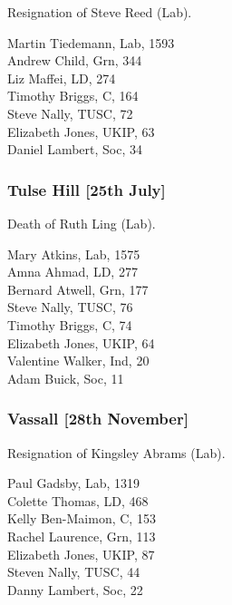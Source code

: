 \documentclass[a4paper,openany,10pt]{book}
\begin{document}

Resignation of Steve Reed (Lab).



Martin Tiedemann, Lab, 1593\\
Andrew Child, Grn, 344\\
Liz Maffei, LD, 274\\
Timothy Briggs, C, 164\\
Steve Nally, TUSC, 72\\
Elizabeth Jones, UKIP, 63\\
Daniel Lambert, Soc, 34\\


\subsubsection*{Tulse Hill \hspace*{\fill}\nolinebreak[1]%
\enspace\hspace*{\fill}
[25th July]}


Death of Ruth Ling (Lab).



Mary Atkins, Lab, 1575\\
Amna Ahmad, LD, 277\\
Bernard Atwell, Grn, 177\\
Steve Nally, TUSC, 76\\
Timothy Briggs, C, 74\\
Elizabeth Jones, UKIP, 64\\
Valentine Walker, Ind, 20\\
Adam Buick, Soc, 11\\


\subsubsection*{Vassall \hspace*{\fill}\nolinebreak[1]%
\enspace\hspace*{\fill}
[28th November]}


Resignation of Kingsley Abrams (Lab).



Paul Gadsby, Lab, 1319\\
Colette Thomas, LD, 468\\
Kelly Ben-Maimon, C, 153\\
Rachel Laurence, Grn, 113\\
Elizabeth Jones, UKIP, 87\\
Steven Nally, TUSC, 44\\
Danny Lambert, Soc, 22\\
\end{document}
